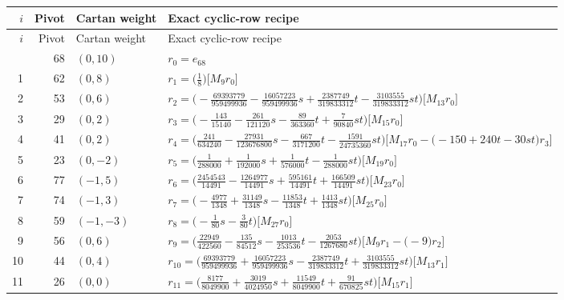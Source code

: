 \begingroup\footnotesize\setlength{\lineskip}{2pt}\setlength{\lineskiplimit}{2pt}
\setlength{\tabcolsep}{5pt}
\begin{longtable}{@{}rrlP{.64\linewidth}@{}}
\toprule
$i$ & Pivot & Cartan weight & Exact cyclic-row recipe\\
\midrule\endfirsthead
\toprule
$i$ & Pivot & Cartan weight & Exact cyclic-row recipe\\
\midrule\endhead
\bottomrule{} & 68 & $(0,10)$ & $r_{0}=e_{68}$\\
1 & 62 & $(0,8)$ & $r_{1}=\bigl(\frac{1}{8}\bigr)\bigl[M_{9}r_{0}\bigr]$\\
2 & 53 & $(0,6)$ & $r_{2}=\bigl(-\frac{69393779}{959499936}-\frac{16057223}{959499936}s+\allowbreak \frac{2387749}{319833312}t-\frac{3103555}{319833312}st\bigr)\bigl[M_{13}r_{0}\bigr]$\\
3 & 29 & $(0,2)$ & $r_{3}=\bigl(-\frac{143}{15140}-\frac{261}{121120}s-\frac{89}{363360}t+\allowbreak \frac{7}{90840}st\bigr)\bigl[M_{15}r_{0}\bigr]$\\
4 & 41 & $(0,2)$ & $r_{4}=\bigl(\frac{241}{634240}-\frac{27931}{123676800}s-\frac{667}{3171200}t-\frac{1591}{24735360}st\bigr)\bigl[M_{17}r_{0}-\allowbreak \bigl(-150+\allowbreak 240t-30st\bigr)r_{3}\bigr]$\\
5 & 23 & $(0,-2)$ & $r_{5}=\bigl(\frac{1}{288000}+\allowbreak \frac{1}{192000}s+\allowbreak \frac{1}{576000}t-\frac{1}{288000}st\bigr)\bigl[M_{19}r_{0}\bigr]$\\
6 & 77 & $(-1,5)$ & $r_{6}=\bigl(\frac{2454543}{14491}-\frac{1264977}{14491}s+\allowbreak \frac{595161}{14491}t+\allowbreak \frac{166509}{14491}st\bigr)\bigl[M_{23}r_{0}\bigr]$\\
7 & 74 & $(-1,3)$ & $r_{7}=\bigl(-\frac{4977}{1348}+\allowbreak \frac{31149}{1348}s-\frac{11853}{1348}t+\allowbreak \frac{1413}{1348}st\bigr)\bigl[M_{25}r_{0}\bigr]$\\
8 & 59 & $(-1,-3)$ & $r_{8}=\bigl(-\frac{1}{80}s-\frac{3}{80}t\bigr)\bigl[M_{27}r_{0}\bigr]$\\
9 & 56 & $(0,6)$ & $r_{9}=\bigl(\frac{22949}{422560}-\frac{135}{84512}s-\frac{1013}{253536}t-\frac{2053}{1267680}st\bigr)\bigl[M_{9}r_{1}-\allowbreak \bigl(-9\bigr)r_{2}\bigr]$\\
10 & 44 & $(0,4)$ & $r_{10}=\bigl(\frac{69393779}{959499936}+\allowbreak \frac{16057223}{959499936}s-\frac{2387749}{319833312}t+\allowbreak \frac{3103555}{319833312}st\bigr)\bigl[M_{13}r_{1}\bigr]$\\
11 & 26 & $(0,0)$ & $r_{11}=\bigl(\frac{8177}{8049900}+\allowbreak \frac{3019}{4024950}s+\allowbreak \frac{11549}{8049900}t+\allowbreak \frac{91}{670825}st\bigr)\bigl[M_{15}r_{1}\bigr]$\\

\end{longtable}
